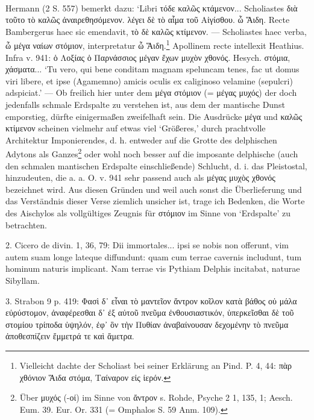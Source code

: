 \documentclass[a4paper, 11pt, oneside]{article}
\begin{document}
\paragraph{}
Hermann (2 S. 557) bemerkt dazu: `Libri τόδε καλῶς κτάμενον... Scholiastes διὰ τοῦτο τὸ καλῶς ἀναιρεθησόμενον. λέγει δὲ τὸ αἷμα τοῦ Αἰγίσθου. ὦ Ἅιδη. Recte Bambergerus haec sic emendavit, τὸ δὲ καλῶς κτίμενον. --- Scholiastes haec verba, ὦ μέγα ναίων στόμιον, interpretatur ὦ Ἅιδη.\footnote{Vielleicht dachte der Scholiast bei seiner Erklärung an Pind. P. 4, 44: πὰρ χθόνιον Ἅιδα στόμα, Ταίναρον εἰς ἱερόν.} Apollinem recte intellexit Heathius. Infra v. 941: ὁ Λοξίας ὁ Παρνάσσιος μέγαν ἔχων μυχὸν χθονός. Hesych. στόμια, χάσματα... `Tu vero, qui bene conditam magnam speluncam tenes, fac ut domus viri libere, et ipse (Agamemno) amicis oculis ex caliginoso velamine (sepulcri) adspiciat.' --- Ob freilich hier unter dem μέγα στόμιον (= μέγας μυχός) der doch jedenfalls schmale Erdspalte zu verstehen ist, aus dem der mantische Dunst emporstieg, dürfte einigermaßen zweifelhaft sein. Die Ausdrücke μέγα und καλῶς κτίμενον scheinen vielmehr auf etwas viel `Größeres,' durch prachtvolle Architektur Imponierendes, d. h. entweder auf die Grotte des delphischen Adytons als Ganzes\footnote{Über μυχός (-οί) im Sinne von ἄντρον s. Rohde, Psyche 2 1, 135, 1; Aesch. Eum. 39. Eur. Or. 331 (= Omphalos S. 59 Anm. 109).} oder wohl noch besser auf die imposante delphische (auch den schmalen mantischen Erdspalte einschließende) Schlucht, d. i. das Pleistostal, hinzudeuten, die a. a. O. v. 941 sehr passend auch als μέγας μυχὸς χθονός bezeichnet wird. Aus diesen Gründen und weil auch sonst die Überlieferung und das Verständnis dieser Verse ziemlich unsicher ist, trage ich Bedenken, die Worte des Aischylos als vollgültiges Zeugnis für στόμιον im Sinne von `Erdspalte' zu betrachten.

2. Cicero de divin. 1, 36, 79: Dii immortales... ipsi se nobis non offerunt, vim autem suam longe lateque diffundunt: quam cum terrae cavernis includunt, tum hominum naturis implicant. Nam terrae vis Pythiam Delphis incitabat, naturae Sibyllam.

3. Strabon 9 p. 419: Φασὶ δ᾽ εἶναι τὸ μαντεῖον ἄντρον κοῖλον κατὰ βάθος οὐ μάλα εὐρύστομον, ἀναφέρεσθαι δ᾽ ἐξ αὐτοῦ πνεῦμα ἐνθουσιαστικόν, ὑπερκεῖσθαι δὲ τοῦ στομίου τρίποδα ὑψηλόν, ἐφ᾽ ὃν τὴν Πυθίαν ἀναβαίνουσαν δεχομένην τὸ πνεῦμα ἀποθεσπίζειν ἔμμετρά τε καὶ ἄμετρα.
\end{document}

